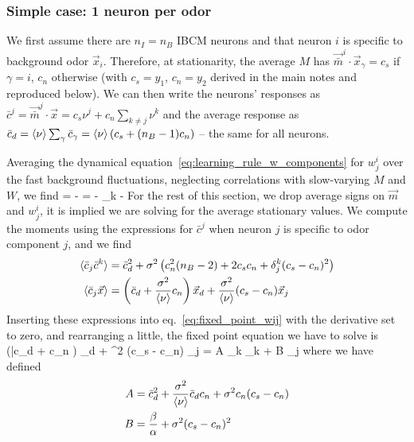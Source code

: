 \subsubsection{Simple case: 1 neuron per odor}
We first assume there are $n_I = n_B$ IBCM neurons and that neuron $i$ is specific to background odor $\vec{x}_i$. Therefore, at stationarity, the average $M$ has $\vec{\bar{m}}^i \cdot \vec{x}_{\gamma} = c_s$ if $\gamma = i$, $c_n$ otherwise (with $c_s = y_1$, $c_n = y_2$ derived in the main notes and reproduced below). We can then write the neurons' responses as $\bar{c}^j = \vec{\bar{m}}^j \cdot \vec{x} = c_s \nu^j + c_n \sum_{k \neq j} \nu^k$ and the average response as $\bar{c}_d = \braket{\nu} \sum_{\gamma} \bar{c}_{\gamma} = \braket{\nu} (c_s + (n_B -1) c_n)$ --  the same for all neurons. 

Averaging the dynamical equation~\eqref{eq:learning_rule_w_components} for $w^i_j$ over the fast background fluctuations, neglecting correlations with slow-varying $M$ and $W$, we find
\beq
	 = \alpha {} - \beta {} = \alpha {} - \alpha \sum_k   - \beta {}
	\label{eq:fixed_point_wij}
\eeq
For the rest of this section, we drop average signs on $\vec{m}$ and $w^i_j$, it is implied we are solving for the average stationary values. We compute the moments using the expressions for $\bar{c}^j$ when neuron $j$ is specific to odor component $j$, and we find
\begin{align}
	\braket{\bar{c}_j \bar{c}^k} &= \bar{c}_d^2 + \sigma^2 \left(c_n^2(n_B-2) + 2c_s c_n + \delta^k_j (c_s - c_n)^2 \right)		\label{eq:correlation_cc} \\
	\braket{\bar{c}_j \vec{x}} 		&= \left(\bar{c}_d + \frac{\sigma^2}{\braket{\nu}} c_n\right) \vec{x}_d + \frac{\sigma^2}{\braket{\nu}} (c_s - c_n) \vec{x}_j 	\label{eq:correlation_cx}
\end{align}
Inserting these expressions into eq.~\eqref{eq:fixed_point_wij} with the derivative set to zero, and rearranging a little, the fixed point equation we have to solve is
\beq
\left(\bar{c}_d +  c_n \right)  _d + \sigma^2 (c_s - c_n) _j = A \sum_k _k + B _j
\label{eq:fixed_point_w_general}
\eeq
where we have defined
\begin{align}
	A &= \bar{c}_d^2 + \frac{\sigma^2}{\braket{\nu}} \bar{c}_d c_n + \sigma^2 c_n (c_s - c_n) \nonumber 	\\
	B &= \frac{\beta}{\alpha} + \sigma^2 (c_s - c_n)^2	\label{eq:coefs_ab_equation_w}
\end{align}
